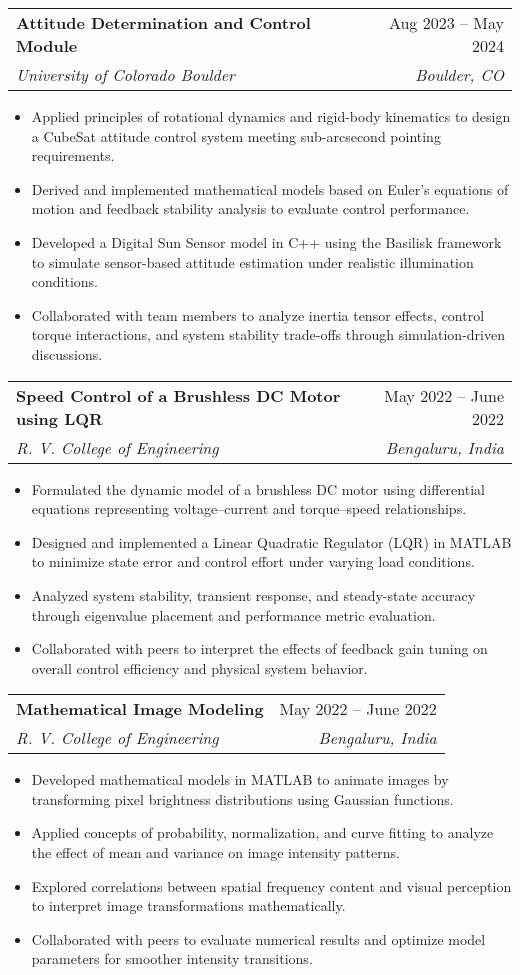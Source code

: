 \documentclass[a4paper,9pt]{article}
\makeatletter
\newcommand{\resumeItemWithoutTitle}[1]{
    \item\small{
        #1 \vspace{-2pt}
    }
}
\newcommand{\resumeSubheading}[4]{
    \vspace{-1pt}\item
        \begin{tabular*}{0.97\textwidth}{l@{\extracolsep{\fill}}r}
            \textbf{#1} & #2 \\
            \textit{#3} & \textit{#4} \\
        \end{tabular*}\vspace{-5pt}
}
\newcommand{\resumeItemListStart}{\begin{itemize}[leftmargin=*]}
\newcommand{\resumeItemListEnd}{\end{itemize}\vspace{-5pt}}
\makeatother
\begin{document}
\resumeSubheading
{Attitude Determination and Control Module}{Aug 2023 – May 2024}
{University of Colorado Boulder}{Boulder, CO}
\resumeItemListStart
\resumeItemWithoutTitle{Applied principles of rotational dynamics and rigid-body kinematics to design a CubeSat attitude control system meeting sub-arcsecond pointing requirements.}
\resumeItemWithoutTitle{Derived and implemented mathematical models based on Euler’s equations of motion and feedback stability analysis to evaluate control performance.}
\resumeItemWithoutTitle{Developed a Digital Sun Sensor model in C++ using the Basilisk framework to simulate sensor-based attitude estimation under realistic illumination conditions.}
\resumeItemWithoutTitle{Collaborated with team members to analyze inertia tensor effects, control torque interactions, and system stability trade-offs through simulation-driven discussions.}
\resumeItemListEnd

\resumeSubheading
{Speed Control of a Brushless DC Motor using LQR}{May 2022 – June 2022}
{R. V. College of Engineering}{Bengaluru, India}
\resumeItemListStart
\resumeItemWithoutTitle{Formulated the dynamic model of a brushless DC motor using differential equations representing voltage–current and torque–speed relationships.}
\resumeItemWithoutTitle{Designed and implemented a Linear Quadratic Regulator (LQR) in MATLAB to minimize state error and control effort under varying load conditions.}
\resumeItemWithoutTitle{Analyzed system stability, transient response, and steady-state accuracy through eigenvalue placement and performance metric evaluation.}
\resumeItemWithoutTitle{Collaborated with peers to interpret the effects of feedback gain tuning on overall control efficiency and physical system behavior.}
\resumeItemListEnd

\resumeSubheading
{Mathematical Image Modeling}{May 2022 – June 2022}
{R. V. College of Engineering}{Bengaluru, India}
\resumeItemListStart
\resumeItemWithoutTitle{Developed mathematical models in MATLAB to animate images by transforming pixel brightness distributions using Gaussian functions.}
\resumeItemWithoutTitle{Applied concepts of probability, normalization, and curve fitting to analyze the effect of mean and variance on image intensity patterns.}
\resumeItemWithoutTitle{Explored correlations between spatial frequency content and visual perception to interpret image transformations mathematically.}
\resumeItemWithoutTitle{Collaborated with peers to evaluate numerical results and optimize model parameters for smoother intensity transitions.}
\resumeItemListEnd
\end{document}
